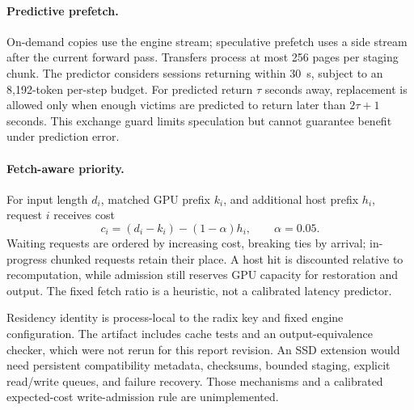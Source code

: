 \paragraph{Predictive prefetch.}
On-demand copies use the engine stream; speculative prefetch uses a side stream after the current forward pass.
Transfers process at most 256 pages per staging chunk.
The predictor considers sessions returning within 30~s, subject to an 8,192-token per-step budget.
For predicted return $\tau$ seconds away, replacement is allowed only when enough victims are predicted to return later than $2\tau+1$ seconds.
This exchange guard limits speculation but cannot guarantee benefit under prediction error.

\paragraph{Fetch-aware priority.}
For input length $d_i$, matched GPU prefix $k_i$, and additional host prefix $h_i$, request $i$ receives cost
\begin{equation}
 c_i=(d_i-k_i)-(1-\alpha)h_i,\qquad \alpha=0.05.
 \label{eq:fetch-aware-priority}
\end{equation}
Waiting requests are ordered by increasing cost, breaking ties by arrival; in-progress chunked requests retain their place.
A host hit is discounted relative to recomputation, while admission still reserves GPU capacity for restoration and output.
The fixed fetch ratio is a heuristic, not a calibrated latency predictor.

Residency identity is process-local to the radix key and fixed engine configuration.
The artifact includes cache tests and an output-equivalence checker, which were not rerun for this report revision.
An SSD extension would need persistent compatibility metadata, checksums, bounded staging, explicit read/write queues, and failure recovery.
Those mechanisms and a calibrated expected-cost write-admission rule are unimplemented.
